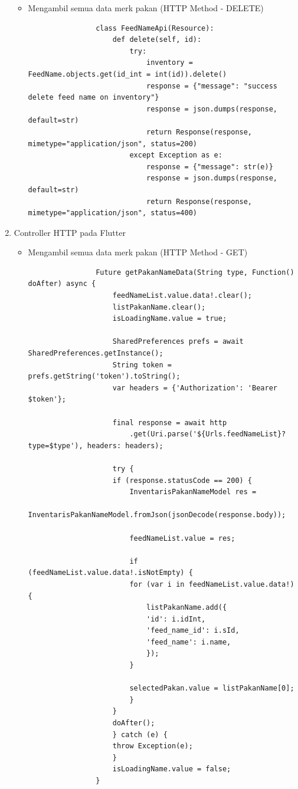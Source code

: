 \begin{spacing}{1.5}
\begin{enumerate}
\begin{itemize}
			\item Mengambil semua data merk pakan (HTTP Method - DELETE)
			
			\begin{lstlisting}
				class FeedNameApi(Resource):
					def delete(self, id):
						try:
							inventory = FeedName.objects.get(id_int = int(id)).delete()
							response = {"message": "success delete feed name on inventory"}
							response = json.dumps(response, default=str)
							return Response(response, mimetype="application/json", status=200)
						except Exception as e:
							response = {"message": str(e)}
							response = json.dumps(response, default=str)
							return Response(response, mimetype="application/json", status=400)
			\end{lstlisting}
		\end{itemize}

		\item Controller HTTP pada Flutter
		
		\begin{itemize}
			\item Mengambil semua data merk pakan (HTTP Method - GET)
				
			\begin{lstlisting}
				Future getPakanNameData(String type, Function() doAfter) async {
					feedNameList.value.data!.clear();
					listPakanName.clear();
					isLoadingName.value = true;

					SharedPreferences prefs = await SharedPreferences.getInstance();
					String token = prefs.getString('token').toString();
					var headers = {'Authorization': 'Bearer $token'};

					final response = await http
						.get(Uri.parse('${Urls.feedNameList}?type=$type'), headers: headers);

					try {
					if (response.statusCode == 200) {
						InventarisPakanNameModel res =
							InventarisPakanNameModel.fromJson(jsonDecode(response.body));

						feedNameList.value = res;

						if (feedNameList.value.data!.isNotEmpty) {
						for (var i in feedNameList.value.data!) {
							listPakanName.add({
							'id': i.idInt,
							'feed_name_id': i.sId,
							'feed_name': i.name,
							});
						}

						selectedPakan.value = listPakanName[0];
						}
					}
					doAfter();
					} catch (e) {
					throw Exception(e);
					}
					isLoadingName.value = false;
				}
			\end{lstlisting}


\end{itemize}
\end{enumerate}
\end{spacing}
